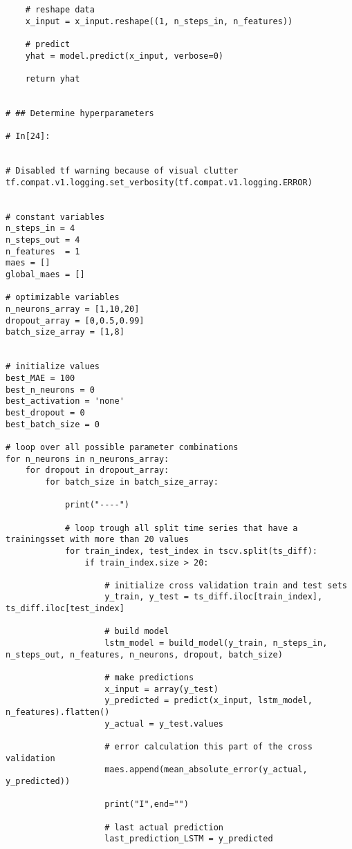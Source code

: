 \begin{verbatim}
    # reshape data
    x_input = x_input.reshape((1, n_steps_in, n_features))
    
    # predict
    yhat = model.predict(x_input, verbose=0)
    
    return yhat


# ## Determine hyperparameters 

# In[24]:


# Disabled tf warning because of visual clutter
tf.compat.v1.logging.set_verbosity(tf.compat.v1.logging.ERROR)


# constant variables
n_steps_in = 4
n_steps_out = 4
n_features  = 1
maes = []
global_maes = []

# optimizable variables
n_neurons_array = [1,10,20]
dropout_array = [0,0.5,0.99]
batch_size_array = [1,8]


# initialize values
best_MAE = 100
best_n_neurons = 0
best_activation = 'none'
best_dropout = 0
best_batch_size = 0

# loop over all possible parameter combinations
for n_neurons in n_neurons_array:
    for dropout in dropout_array:
        for batch_size in batch_size_array:

            print("----")
            
            # loop trough all split time series that have a trainingsset with more than 20 values
            for train_index, test_index in tscv.split(ts_diff): 
                if train_index.size > 20:  
                    
                    # initialize cross validation train and test sets
                    y_train, y_test = ts_diff.iloc[train_index], ts_diff.iloc[test_index]

                    # build model
                    lstm_model = build_model(y_train, n_steps_in, n_steps_out, n_features, n_neurons, dropout, batch_size)

                    # make predictions
                    x_input = array(y_test)
                    y_predicted = predict(x_input, lstm_model, n_features).flatten()
                    y_actual = y_test.values

                    # error calculation this part of the cross validation
                    maes.append(mean_absolute_error(y_actual, y_predicted))

                    print("I",end="")

                    # last actual prediction 
                    last_prediction_LSTM = y_predicted


\end{verbatim}
